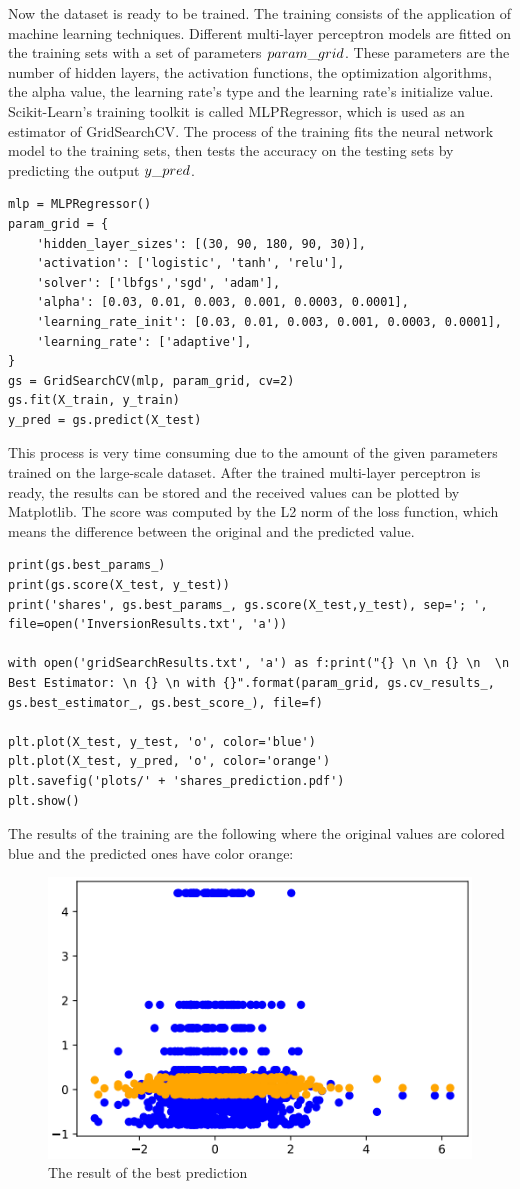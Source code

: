 Now the dataset is ready to be trained. The training consists of the application of machine learning techniques. Different multi-layer perceptron models are fitted on the training sets with a set of parameters $param\char`_grid$. These parameters are the number of hidden layers, the activation functions, the optimization algorithms, the alpha value, the learning rate's type and the learning rate's initialize value. Scikit-Learn's training toolkit is called MLPRegressor, which is used as an estimator of GridSearchCV. The process of the training fits the neural network model to the training sets, then tests the accuracy on the testing sets by predicting the output $y\char`_pred$.  
\begin{lstlisting}
mlp = MLPRegressor()
param_grid = {
	'hidden_layer_sizes': [(30, 90, 180, 90, 30)],
	'activation': ['logistic', 'tanh', 'relu'],
	'solver': ['lbfgs','sgd', 'adam'],
	'alpha': [0.03, 0.01, 0.003, 0.001, 0.0003, 0.0001],
	'learning_rate_init': [0.03, 0.01, 0.003, 0.001, 0.0003, 0.0001],
	'learning_rate': ['adaptive'],
}
gs = GridSearchCV(mlp, param_grid, cv=2)
gs.fit(X_train, y_train)
y_pred = gs.predict(X_test)
\end{lstlisting}
This process is very time consuming due to the amount of the given parameters trained on the large-scale dataset. After the trained multi-layer perceptron is ready, the results can be stored and the
received values can be plotted by Matplotlib. The score was computed by the L2 norm of the loss function, which means the difference between the original and the predicted value.
\begin{lstlisting}
print(gs.best_params_)
print(gs.score(X_test, y_test))
print('shares', gs.best_params_, gs.score(X_test,y_test), sep='; ', file=open('InversionResults.txt', 'a'))

with open('gridSearchResults.txt', 'a') as f:print("{} \n \n {} \n  \n Best Estimator: \n {} \n with {}".format(param_grid, gs.cv_results_, gs.best_estimator_, gs.best_score_), file=f)

plt.plot(X_test, y_test, 'o', color='blue')
plt.plot(X_test, y_pred, 'o', color='orange')
plt.savefig('plots/' + 'shares_prediction.pdf')
plt.show()
\end{lstlisting}

\bigskip The results of the training are the following where the original values are colored blue and the predicted ones have color orange:
\begin{figure}[h]
	\centering
	\includegraphics[height=0.378\linewidth]{./figures/shares_prediction}
	\caption{The result of the best prediction}
	\label{fig:shares}
\end{figure}

